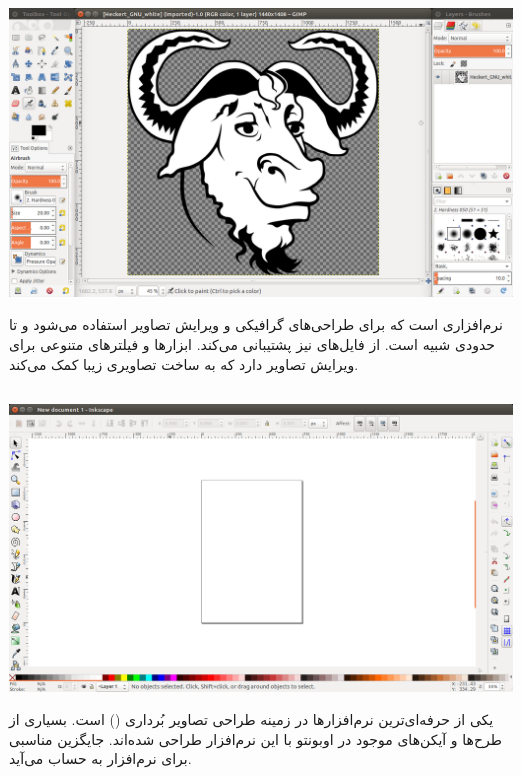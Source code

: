 \subsection[Gimp]{}

\begin{center}
\includegraphics[scale=0.36]{pics/41.png}
\end{center}

نرم‌افزاری است که برای طراحی‌های گرافیکی و ویرایش تصاویر استفاده می‌شود و تا حدودی شبیه  است. از فایل‌های  نیز پشتیبانی می‌کند.  ابزارها و فیلترهای متنوعی برای ویرایش تصاویر دارد که به ساخت تصاویری زیبا کمک می‌کند.

\subsection[Inkscape]{}

\begin{center}
\includegraphics[scale=0.3]{pics/42.png}
\end{center}

یکی از حرفه‌ای‌ترین نرم‌افزارها در زمینه طراحی تصاویر بُرداری () است. بسیاری از طرح‌ها و آیکن‌های موجود در اوبونتو با این نرم‌افزار طراحی شده‌اند.  جایگزین مناسبی برای نرم‌افزار  به حساب می‌آید.

